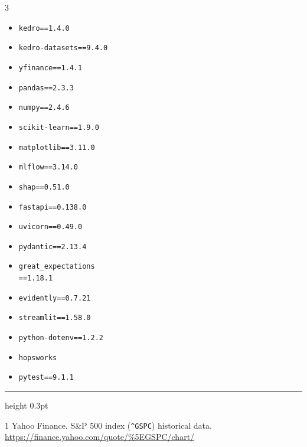 \documentclass[12pt]{article}
\begin{document}
\vspace{-2pt}
\begin{multicols}{3}
\footnotesize
\begin{itemize}[leftmargin=1.1em, itemsep=0pt, topsep=1pt]
\item \texttt{kedro==1.4.0}
\item \texttt{kedro-datasets==9.4.0}
\item \texttt{yfinance==1.4.1}
\item \texttt{pandas==2.3.3}
\item \texttt{numpy==2.4.6}
\item \texttt{scikit-learn==1.9.0}
\item \texttt{matplotlib==3.11.0}
\item \texttt{mlflow==3.14.0}
\item \texttt{shap==0.51.0}
\item \texttt{fastapi==0.138.0}
\item \texttt{uvicorn==0.49.0}
\item \texttt{pydantic==2.13.4}
\item \texttt{great\_expectations}\\\texttt{==1.18.1}
\item \texttt{evidently==0.7.21}
\item \texttt{streamlit==1.58.0}
\item \texttt{python-dotenv==1.2.2}
\item \texttt{hopsworks}
\item \texttt{pytest==9.1.1}
\end{itemize}
\end{multicols}

\vspace{2pt}
\hrule height 0.3pt
\vspace{4pt}
\renewcommand{\refname}{References}
\begin{thebibliography}{1}
\small
{}
Yahoo Finance. S\&P 500 index (\texttt{\^{}GSPC}) historical data.
\url{https://finance.yahoo.com/quote/\%5EGSPC/chart/}
\end{thebibliography}
\end{document}
